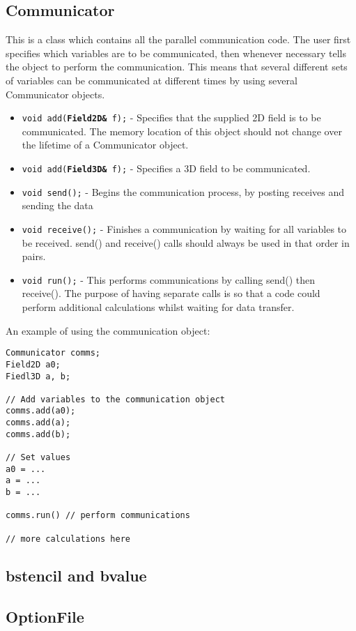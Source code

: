 \documentclass[12pt, a4paper]{article}
\newcommand{\code}[1]{\texttt{#1}}
\begin{document}
\subsection{Communicator}

This is a class which contains all the parallel communication code. The user
first specifies which variables are to be communicated, then whenever necessary
tells the object to perform the communication. This means that several different
sets of variables can be communicated at different times by using several Communicator
objects.

\begin{itemize}
\item \code{void add({\bf Field2D\&} f);} - Specifies that the supplied 2D field is to be communicated.
The memory location of this object should not change over the lifetime of a Communicator object.
\item \code{void add({\bf Field3D\&} f);} - Specifies a 3D field to be communicated.
\item \code{void send();} - Begins the communication process, by posting receives and sending the data
\item \code{void receive();} - Finishes a communication by waiting for all variables to be received.
send() and receive() calls should always be used
in that order in pairs.
\item \code{void run();} - This performs communications by calling send() then receive(). The purpose
of having separate calls is so that a code could perform additional calculations whilst waiting for
data transfer.
\end{itemize}
An example of using the communication object:
\begin{verbatim}
Communicator comms;
Field2D a0;
Fiedl3D a, b;

// Add variables to the communication object
comms.add(a0);
comms.add(a);
comms.add(b);

// Set values
a0 = ...
a = ...
b = ...

comms.run() // perform communications

// more calculations here
\end{verbatim}

\subsection{bstencil and bvalue}

\subsection{OptionFile}
\end{document}
